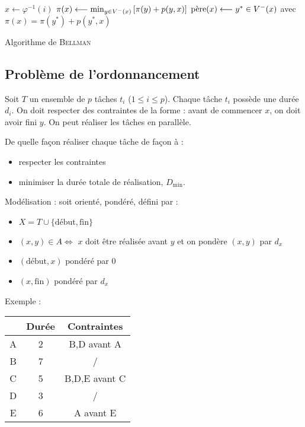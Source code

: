 \documentclass[a4paper, 8pt]{article}
\begin{document}
\begin{multicols*}{3}
\begin{algorithm}[H]
 {
 	$x \longleftarrow \varphi^{-1}(i)$ \;
 	$\pi(x) \longleftarrow \min_{y\in \Vm(x)}\left[\pi(y) + p(y,x)\right]$ \;
 	{\footnotesize {} }
 	$\pere(x) \longleftarrow y^*\in \Vm(x)$ avec $\pi(x) = \pi(y^*) + p(y^*,x)$ \;
 }
 
 \caption{Algorithme de \textsc{Bellman}}
\end{algorithm}

 \subsection*{Problème de l'ordonnancement}
 
\newcommand{\Dmin}{D_{\text{min}}} 
\newcommand{\debut}{\text{début}}
\newcommand{\fin}{\text{fin}}
 
 Soit $T$ un ensemble de $p$ tâches $t_i$ ($1\leqslant i\leqslant p$). Chaque tâche $t_i$ possède une durée $d_i$. On doit respecter des contraintes de la forme : avant de commencer $x$, on doit avoir fini $y$. On peut réaliser les tâches en parallèle.
 
De quelle façon réaliser chaque tâche de façon à :
\begin{itemize}
	\item respecter les contraintes
	\item minimiser la durée totale de réalisation, $\Dmin$.
\end{itemize}

Modélisation : soit \GXA orienté, pondéré, défini par :
\begin{itemize}
	\item $X = T \cup \{\debut,\fin\}$
	\item $(x,y)\in A \Longleftrightarrow$ $x$ doit être réalisée avant $y$ et on pondère $(x,y)$ par $d_x$
	\item $(\debut,x)$ pondéré par 0
	\item $(x,\fin)$ pondéré par $d_x$
\end{itemize}

Exemple :
\begin{center}
\begin{tabular}{ccc}
 & Durée & Contraintes \\ 
\hline \hline
A & 2 & B,D avant A \\ 
\hline 
B & 7 & / \\ 
\hline 
C & 5 & B,D,E avant C \\ 
\hline 
D & 3 & / \\ 
\hline 
E & 6 & A avant E \\ 
\end{tabular} 
\end{center}


\end{multicols*}
\end{document}
